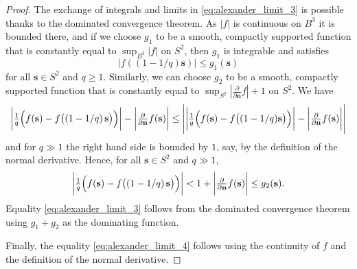\documentclass[10pt,a4paper]{amsart}
\renewcommand{\vec}{\mathbf}
\begin{document}
\begin{proof}
The exchange of integrals and limits in \eqref{eq:alexander_limit_3} is possible thanks to the dominated convergence theorem. As \(|f|\) is continuous on \(B^3\) it is bounded there, and if we choose \(g_1\) to be a smooth, compactly supported function that is constantly equal to \(\sup_{B^3}|f|\) on \(S^2\), then \(g_1\) is integrable and satisfies 
\[\bigl|f((1-1/q) \vec{s})\bigr| \leq g_1(\vec{s})\]
for all \(\vec{s} \in S^2\) and \(q 
\geq 1\). Similarly, we can choose \(g_2\) to be a smooth, compactly supported function that is constantly equal to \(\sup_{S^2} \left| \tfrac{\partial}{\partial \vec{n}} f \right| + 1\) on \(S^2\). We have 
\[
    \biggl|  
        \tfrac{1}{q} 
        \Bigl(
            f(\vec{s}) - f\bigl(\left(1 - 1/q \right)\vec{s}\bigr) 
        \Bigr)
    \biggr| 
    - 
    \biggl| 
        \tfrac{\partial}{\partial \vec{n}} f(\vec{s}) 
    \biggr| 
    \leq 
    \Biggl| 
        \biggl|  
            \tfrac{1}{q} 
            \Bigl(
                f(\vec{s}) - 
                f\bigl(
                    (1-1/q)\vec{s}
                \bigr) 
            \Bigr)
        \biggr| 
        - 
        \biggl| 
            \tfrac{\partial}{\partial \vec{n}} f(\vec{s}) 
        \biggr| 
    \Biggr| 
\]
and for \(q \gg 1\) the right hand side is bounded by \(1\), say, by the definition of the normal derivative.  Hence, for all \(\vec{s} \in S^2\) and \(q \gg 1\),
\[
    \biggl|  
        \tfrac{1}{q} 
        \Bigl(
            f(\vec{s}) - f\bigl(\left(1 - 1/q \right)\vec{s}\bigr) 
        \Bigr)
    \biggr| 
    < 
    1
    +
    \biggl| 
        \tfrac{\partial}{\partial \vec{n}} f(\vec{s}) 
    \biggr| 
    \leq 
    g_2(\vec{s})
    .
\]
Equality \eqref{eq:alexander_limit_3} follows from the dominated convergence theorem using \(g_1 + g_2\) as the dominating function.

Finally, the equality \eqref{eq:alexander_limit_4} follows using the continuity of \(f\) and the definition of the normal derivative.
\end{proof}
\end{document}
